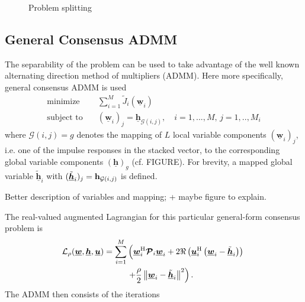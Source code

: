 \documentclass{article}
\newcommand{\h}{\mtxb{h}}
\newcommand{\hf}{\underline{\bm{h}}}
\newcommand{\wf}{\underline{\bm{w}}}
\newcommand{\uuf}{\underline{\bm{u}}}
\newcommand{\aRhof}{\bm{\mathcal{P}}}
\begin{document}
\begin{figure}
    \centering
    
    \caption{Problem splitting}
    \label{fig:problem_splitting:problem_splitting_matrix}
\end{figure}

\subsection{General Consensus ADMM}
\label{ssec:general_consensus_admm}
The separability of the problem can be used to take advantage of the well known alternating direction method of multipliers (ADMM).
Here more specifically, general consensus ADMM \cite{} is used 
\begin{align}
    \operatorname{minimize} \quad &\sum_{i=1}^{M} \tilde{J}_i(\wf_i)\\
    \text{subject to} \quad &(\wf_i)_j = \hf_{\mathcal{G}(i,j)},\quad i=1,...,M,\,j=1,..,M_i
\end{align}
where \(\mathcal{G}(i,j)=g\) denotes the mapping of \(L\) local variable components \((\wf_i)_j\), i.e. one of the impulse responses in the stacked vector, to the corresponding global variable components \((\hf)_g\) (cf. FIGURE). For brevity, a mapped global variable \(\tilde{\hf}_i\) with \((\tilde{\hf}_i)_j = \h_{\mathcal{G}(i,j)}\) is defined.
\begin{note}
    Better description of variables and mapping; + maybe figure to explain.
\end{note}
The real-valued augmented Lagrangian for this particular general-form consensus problem is
\begin{align}
    \mathcal{L}_{\rho} (\wf,\hf,\uuf) = \sum_{i=1}^M &\left( \wf_i^\herm \aRhof_i \wf_i + 2 \Re \left(\uuf_i^{\herm} \left(\wf_i - \tilde{\hf}_i\right)\right) \vphantom{+ \frac{\rho}{2} \left\| \wf_i - \tilde{\hf}_i \right\|^2} \right.\nonumber\\
    &\left.+ \frac{\rho}{2} \left\| \wf_i - \tilde{\hf}_i \right\|^2 \right).\label{eq:general_consensus_admm:lagrangian}
\end{align}
The ADMM then consists of the iterations
\end{document}
